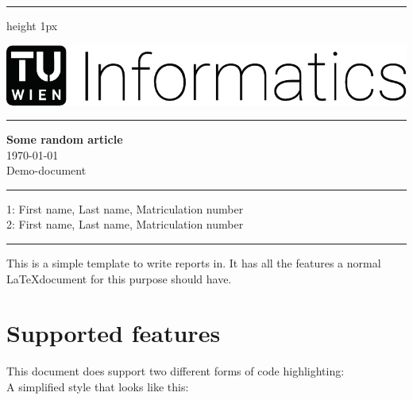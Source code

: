 \documentclass[a4paper,%
11pt,%
DIV=14,
headings=normal,
parskip=full
]{scrartcl}
\begin{document}
\thispagestyle{plain.scrheadings}
\noindent
\hrule height 1px
\vspace*{-1ex}
\begin{minipage}[t]{.45\linewidth}
\strut\vspace*{-\baselineskip}\newline
\hspace*{1ex}\includegraphics[height=.9cm]{./figs/Inf-Logo_black_en.pdf}
\end{minipage}
\hfill
\begin{minipage}[t]{.5\linewidth}
\end{minipage}
\vspace*{1ex}
\hrule 
\vspace*{-1ex}
\begin{center}
{\LARGE\textbf{Some random article}}\\
{\large{}%
  \today\\
  Demo-document\\
}
\end{center}
\vspace*{2ex}
\hrule 
\vspace*{1ex}
\vspace*{-2.5ex}
1: First name, Last name, Matriculation number\\
2: First name, Last name, Matriculation number

\vspace*{1ex}
\hrule 



\vspace*{2ex}
This is a simple template to write reports in. It has all the features a normal \LaTeX document for this purpose should have.

\section{Supported features}
This document does support two different forms of code highlighting:\\
A simplified style that looks like this:
\end{document}
